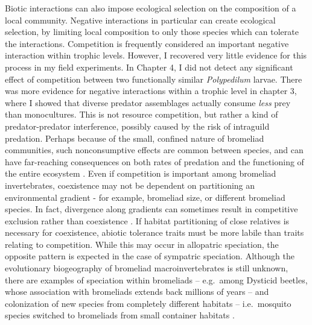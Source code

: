 Biotic interactions can also impose ecological selection on the
composition of a local community. Negative interactions in particular
can create ecological selection, by limiting local composition to only
those species which can tolerate the interactions. Competition is
frequently considered an important negative interaction within trophic
levels. However, I recovered very little evidence for this process in my
field experiments. In Chapter 4, I did not detect any significant effect
of competition between two functionally similar \emph{Polypedilum}
larvae. There was more evidence for negative interactions within a
trophic level in chapter 3, where I showed that diverse predator
assemblages actually consume \emph{less} prey than monocultures. This is
not resource competition, but rather a kind of predator-predator
interference, possibly caused by the risk of intraguild predation.
Perhaps because of the small, confined nature of bromeliad communities,
such nonconsumptive effects are common between species, and can have
far-reaching consequences on both rates of predation and the functioning
of the entire ecosystem \citep{Atwood2014}. Even if competition is
important among bromeliad invertebrates, coexistence may not be
dependent on partitioning an environmental gradient - for example,
bromeliad size, or different bromeliad species. In fact, divergence
along gradients can sometimes result in competitive exclusion rather
than coexistence \citep{Mayfield2010}. If habitat partitioning of close
relatives is necessary for coexistence, abiotic tolerance traits must be
more labile than traits relating to competition. While this may occur in
allopatric speciation, the opposite pattern is expected in the case of
sympatric speciation. Although the evolutionary biogeography of
bromeliad macroinvertebrates is still unknown, there are examples of
speciation within bromeliads -- e.g.~among Dysticid beetles, whose
association with bromeliads extends back millions of years
\citep{Balke2008} -- and colonization of new species from completely
different habitats -- i.e.~mosquito species switched to bromeliads from
small container habitats \citep{Kitching2001}.

